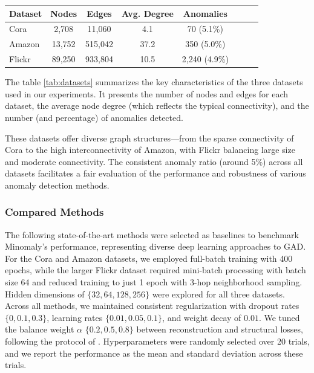 \documentclass[pdflatex,sn-mathphys-num]{sn-jnl}%
\renewenvironment{table}[1][]%
{\tableorg[#1]%
\tablebodyfont%
\renewcommand\footnotetext[2][]{{\removelastskip\vskip0pt%
\let\tablebodyfont\tablefootnotefont%
\hskip0pt\if!##1!\else{\smash{$^{##1}$}}\fi##2\par}}%
}{\endtableorg}
\theoremstyle{thmstyleone}%
\theoremstyle{thmstyletwo}%
\theoremstyle{thmstylethree}%
\begin{document}
\begin{table}[H]
\centering
\caption{Dataset Statistics}
\label{tab:datasets}
\scriptsize
\begin{tabular}{lccccccc}
\toprule
Dataset       & Nodes  & Edges   & Avg. Degree & Anomalies \\
\midrule
Cora     & 2,708  & 11,060  & 4.1         & 70 (5.1\%)    \\
Amazon   & 13,752 & 515,042 & 37.2        & 350 (5.0\%)    \\
Flickr   & 89,250 & 933,804 & 10.5        & 2,240 (4.9\%)    \\
\bottomrule
\end{tabular}
\end{table}

The table \ref{tab:datasets} summarizes the key characteristics of the three datasets used in our experiments. It presents the number of nodes and edges for each dataset, the average node degree (which reflects the typical connectivity), and the number (and percentage) of anomalies detected.

These datasets offer diverse graph structures—from the sparse connectivity of Cora to the high interconnectivity of Amazon, with Flickr balancing large size and moderate connectivity. The consistent anomaly ratio (around 5\%) across all datasets facilitates a fair evaluation of the performance and robustness of various anomaly detection methods.

\subsubsection{Compared Methods}
The following state-of-the-art methods were selected as baselines to benchmark Minomaly's performance, representing diverse deep learning approaches to GAD. For the Cora and Amazon datasets, we employed full-batch training with 400 epochs, while the larger Flickr dataset required mini-batch processing with batch size 64 and reduced training to just 1 epoch with 3-hop neighborhood sampling. Hidden dimensions of $\{32, 64, 128, 256\}$ were explored for all three datasets. Across all methods, we maintained consistent regularization with dropout rates $\{0, 0.1, 0.3\}$, learning rates $\{0.01, 0.05, 0.1\}$, and weight decay of $0.01$. We tuned the balance weight $\alpha$ $\{0.2, 0.5, 0.8\}$ between reconstruction and structural losses, following the protocol of \cite{NEURIPS2022-acc1ec4a}. Hyperparameters were randomly selected over 20 trials, and we report the performance as the mean and standard deviation across these trials.
\end{document}
